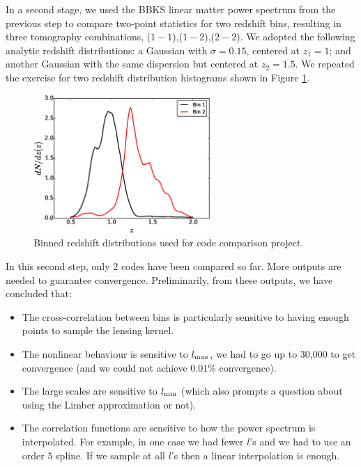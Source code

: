 \documentclass[\docopts]{\docclass}
\begin{document}
In a second stage, we used the BBKS linear matter power spectrum from the previous step to compare two-point statistics for two redshift bins, resulting in three tomography combinations, ($1-1$),($1-2$),($2-2$). We adopted the following analytic redshift distributions: a Gaussian with $\sigma = 0.15$, centered at $z_1 = 1$; and another Gaussian with the same dispersion but centered at $z_2 = 1.5$. We repeated the exercise for two redshift distribution histograms shown in Figure \ref{fig:zhistos}.

\begin{figure}
\centering
\includegraphics[width=0.6\textwidth]{zdist.eps}
\caption{Binned redshift distributions used for code comparison project.}
\label{fig:zhistos}
\end{figure}

In this second step, only 2 codes have been compared so far. More outputs are needed to guarantee convergence. Preliminarily, from these outputs, we have concluded that:
\begin{itemize}
\item The cross-correlation between bins is particularly sensitive to having enough points to sample the lensing kernel.
\item The nonlinear behaviour is sensitive to $l_{\rm max}$, we had to go up to 30,000 to get convergence (and we could not achieve $0.01\%$ convergence).
\item The large scales are sensitive to $l_{\rm min}$ (which also prompts a question about using the Limber approximation or not).
\item The correlation functions are sensitive to how the power spectrum is interpolated. For example, in one case we had fewer $l$'s and we had to use an order $5$ spline. If we sample at all $l$'s then a linear interpolation is enough.
\end{itemize}
\end{document}
